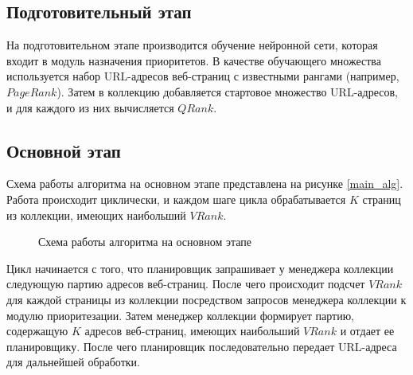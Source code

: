 \subsection*{Подготовительный этап}

На подготовительном этапе производится обучение нейронной сети, которая входит в модуль назначения приоритетов. В качестве обучающего множества используется набор URL-адресов веб-страниц с известными рангами (например, $PageRank$). Затем в коллекцию добавляется стартовое множество URL-адресов, и для каждого из них вычисляется $QRank$.

\subsection*{Основной этап}

Схема работы алгоритма на основном этапе представлена на рисунке \ref{main_alg}. Работа происходит циклически, и каждом шаге цикла обрабатывается $K$ страниц из коллекции, имеющих наибольший $VRank$.

\begin{figure}[h!]
\caption{Схема работы алгоритма на основном этапе}
\label{architecture}
\end{figure}

Цикл начинается с того, что планировщик запрашивает у менеджера коллекции следующую партию адресов веб-страниц. После чего происходит подсчет $VRank$ для каждой страницы из коллекции посредством запросов менеджера коллекции к модулю приоритезации. Затем менеджер коллекции формирует партию, содержащую $K$ адресов веб-страниц, имеющих наибольший $VRank$ и отдает ее планировщику. После чего планировщик последовательно передает URL-адреса для дальнейшей обработки. 

